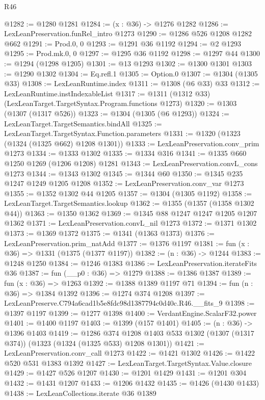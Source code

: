 \begin{lexlean}{R46}
\begin{coremodule}
@1282 := @1280 @1281
@1284 := (x : @36) -> @1276 @1282
@1286 := LexLeanPreservation.funRel_intro @1273
@1290 := @1286 @526 @1208 @1282 @662
@1291 := Prod.{0, 0}
@1293 := @1291 @36 @1192
@1294 := @2 @1293
@1295 := Prod.mk.{0, 0}
@1297 := @1295 @36 @1192
@1298 := @1297 @44
@1300 := @1294 (@1298 @1205)
@1301 := @13 @1293
@1302 := @1300 @1301
@1303 := @1290 @1302
@1304 := Eq.refl.{1}
@1305 := Option.{0}
@1307 := @1304 (@1305 @33)
@1308 := LexLeanRuntime.index
@1311 := @1308 (@6 @33) @33
@1312 := LexLeanRuntime.instIndexableList
@1317 := @1311 (@1312 @33) (LexLeanTarget.TargetSyntax.Program.functions @1273)
@1320 := @1303 (@1307 (@1317 @526))
@1323 := @1304 (@1305 (@6 @1293))
@1324 := LexLeanTarget.TargetSemantics.bindAll
@1325 := LexLeanTarget.TargetSyntax.Function.parameters
@1331 := @1320 (@1323 (@1324 (@1325 @662) @1208 @1301))
@1333 := LexLeanPreservation.conv_prim @1273
@1334 := @1333 @1302
@1335 := @1334 @316
@1341 := @1335 @660 @1250 @1269 (@1206 @1208) @1281
@1343 := LexLeanPreservation.convL_cons @1273
@1344 := @1343 @1302
@1345 := @1344 @60
@1350 := @1345 @235 @1247 @1249 @1205 @1208
@1352 := LexLeanPreservation.conv_var @1273
@1355 := @1352 @1302 @44 @1205
@1357 := @1304 (@1305 @1192)
@1358 := LexLeanTarget.TargetSemantics.lookup
@1362 := @1355 (@1357 (@1358 @1302 @44))
@1363 := @1350 @1362
@1369 := @1345 @88 @1247 @1247 @1205 @1207 @1362
@1371 := LexLeanPreservation.convL_nil @1273
@1372 := @1371 @1302
@1373 := @1369 @1372
@1375 := @1341 (@1363 @1373)
@1376 := LexLeanPreservation.prim_natAdd
@1377 := @1376 @1197
@1381 := fun (x : @36) => @1331 (@1375 (@1377 @1197))
@1382 := (n : @36) -> @1244
@1383 := @1248 @1250
@1384 := @1246 @1383
@1386 := LexLeanPreservation.iterateFits @36
@1387 := fun (__p0 : @36) => @1279
@1388 := @1386 @1387
@1389 := fun (x : @36) => @1263
@1392 := @1388 @1389 @1197 @71
@1394 := fun (n : @36) => @1384 @1392
@1396 := @1274 @374 @1208
@1397 := LexLeanPreserve.C794a6cad1b5e8fdc98d1387794c0d40c.R46.__fits_9
@1398 := @1397 @1197
@1399 := @1277 @1398
@1400 := VerdantEngine.ScalarF32.power
@1401 := @1400 @1197
@1403 := @1399 (@157 @1401)
@1405 := (n : @36) -> @1396 @1403
@1419 := @1286
    @374
    @1208
    @1403
    @533
    @1302
    (@1307 (@1317 @374))
    (@1323 (@1324 (@1325 @533) @1208 @1301))
@1421 := LexLeanPreservation.conv_call @1273
@1422 := @1421 @1302
@1426 := @1422 @520 @531 @1383 @1392
@1427 := LexLeanTarget.TargetSyntax.Value.closure
@1429 := @1427 @526 @1207
@1430 := @1201 @1429
@1431 := @1201 @304
@1432 := @1431 @1207
@1433 := @1206 @1432
@1435 := @1426 (@1430 @1433)
@1438 := LexLeanCollections.iterate @36 @1389

\end{coremodule}
\end{lexlean}
